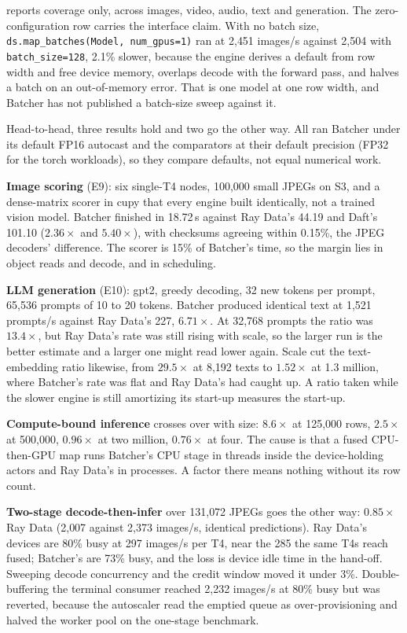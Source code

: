 \documentclass[10pt,twocolumn,letterpaper]{article}   %
\newcommand{\sys}{Batcher}
\newcommand{\E}[1]{\textsf{E#1}}
\begin{document}
 reports coverage only, across images, video, audio, text and generation. The
zero-configuration row carries the interface claim. With no batch size,
\texttt{ds.map\_batches(Model, num\_gpus=1)} ran at 2{,}451 images/s against 2{,}504 with
\texttt{batch\_size=128}, 2.1\% slower, because the engine derives a default from row width and
free device memory, overlaps decode with the forward pass, and halves a batch on an
out-of-memory error. That is one model at one row width, and \sys{} has not published a batch-size
sweep against it.

Head-to-head, three results hold and two go the other way. All ran \sys{} under its default FP16
autocast and the comparators at their default precision (FP32 for the torch workloads), so they
compare defaults, not equal numerical work.

\textbf{Image scoring} (\E{9}): six single-T4 nodes, 100{,}000 small JPEGs on S3, and a
dense-matrix scorer in cupy that every engine built identically, not a trained vision model.
\sys{} finished in 18.72\,s against Ray Data's 44.19 and Daft's 101.10 ($2.36\times$ and
$5.40\times$), with checksums agreeing within 0.15\%, the JPEG decoders' difference. The scorer
is 15\% of \sys{}'s time, so the margin lies in object reads and decode, and in scheduling.

\textbf{LLM generation} (\E{10}): gpt2, greedy decoding, 32 new tokens per prompt, 65{,}536
prompts of 10 to 20 tokens. \sys{} produced identical text at 1{,}521 prompts/s against Ray
Data's 227, $6.71\times$. At 32{,}768 prompts the ratio was $13.4\times$, but Ray Data's rate was
still rising with scale, so the larger run is the better estimate and a larger one might read
lower again. Scale cut the text-embedding ratio likewise, from $29.5\times$ at 8{,}192 texts to
$1.52\times$ at 1.3 million, where \sys{}'s rate was flat and Ray Data's had caught up. A ratio
taken while the slower engine is still amortizing its start-up measures the start-up.

\textbf{Compute-bound inference} crosses over with size: $8.6\times$ at 125{,}000 rows,
$2.5\times$ at 500{,}000, $0.96\times$ at two million, $0.76\times$ at four. The cause is that a
fused CPU-then-GPU map runs \sys{}'s CPU stage in threads inside the device-holding actors and
Ray Data's in processes. A factor there means nothing without its row count.

\textbf{Two-stage decode-then-infer} over 131{,}072 JPEGs goes the other way: $0.85\times$ Ray
Data (2{,}007 against 2{,}373 images/s, identical predictions). Ray Data's devices are 80\% busy at
297 images/s per T4, near the 285 the same T4s reach fused; \sys{}'s are 73\% busy, and the loss
is device idle time in the hand-off. Sweeping decode concurrency and the credit window moved it under
3\%. Double-buffering the terminal consumer reached 2{,}232 images/s at 80\% busy but was
reverted, because the autoscaler read the emptied queue as over-provisioning and halved the
worker pool on the one-stage benchmark.
\end{document}

